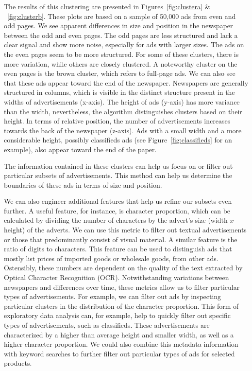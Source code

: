 \documentclass[USenglish]{article}
\begin{document}
The results of this clustering are presented in Figures~\ref{fig:clustera} \& ~\ref{fig:clusterb}. These plots are based on a sample of 50,000 ads from even and odd pages. We see apparent differences in size and position in the newspaper between the odd and even pages. The odd pages are less structured and lack a clear signal and show more noise, especially for ads with larger sizes. The ads on the even pages seem to be more structured. For some of these clusters, there is more variation, while others are closely clustered. A noteworthy cluster on the even pages is the brown cluster, which refers to full-page ads. 
%
We can also see that these ads appear toward the end of the newspaper. Newspapers are generally structured in columns, which is visible in the distinct structure present in the widths of advertisements (x-axis). The height of ads (y-axis) has more variance than the width, nevertheless, the algorithm distinguishes clusters based on their height. In terms of relative position, the number of advertisements increases towards the back of the newspaper (z-axis). Ads with a small width and a more considerable height, possibly classifieds ads (see Figure~\ref{fig:classifieds} for an example), also appear toward the end of the paper. 

The information contained in these clusters can help us focus on or filter out particular subsets of advertisements. This method can help us determine the boundaries of these ads in terms of size and position. 

We can also engineer additional features that help us refine our subsets even further. A useful feature, for instance, is character proportion, which can be calculated by dividing the number of characters by the advert's size (width $x$ height) of the adverts. We can use this metric to filter out textual advertisements or those that predominantly consist of visual material. A similar feature is the ratio of digits to characters. This feature can be used to distinguish ads that mostly list prices of imported goods or wholesale goods, from other ads. 
%
Ostensibly, these numbers are dependent on the quality of the text extracted by Optical Character Recognition (OCR). Notwithstanding variations between newspapers and differences over time, these metrics allow us to filter particular types of advertisements. For example, we can filter out ads by inspecting particular clusters in the distribution of the character proportion. This form of exploratory data analysis can, for example, help to quickly filter out specific types of advertisements, such as classifieds. These advertisements are characterized by a higher than average height and smaller width, as well as a higher character proportion. We could also combine this metadata information with keyword searches to further filter out particular types of ads for selected products. 
\end{document}
